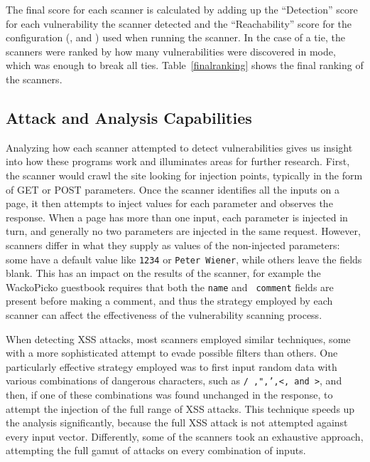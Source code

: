 

The final score for each scanner is calculated by adding up the ``Detection''
score for each vulnerability the scanner detected and the ``Reachability'' score
for the configuration (\initial{}, \config{} and \manual{}) used when
running the scanner. In the case of a tie, the scanners were ranked
by how many vulnerabilities were discovered in \initial{} mode, which
was enough to break all ties. Table~\ref{finalranking} shows the
final ranking of the scanners.


\subsection{Attack and Analysis Capabilities}
\label{attack-and-analysis}
Analyzing how each scanner attempted to detect vulnerabilities gives
us insight into how these programs work and  illuminates areas for
further research. First, the scanner would crawl the site
looking for injection points, typically in the form of GET or POST parameters.
Once the scanner identifies all the inputs on a page, it then attempts to inject
values for each parameter and observes the response. When a page
has more than one input, each parameter is injected in turn, and generally no
two parameters are injected in the same request. However, scanners differ in
what they supply as values of the non-injected parameters: some have a
default value like {\tt 1234} or {\tt Peter Wiener}, while others leave the
fields blank. This has an impact on the results of the scanner, for
example the WackoPicko guestbook requires that both the {\tt name} and {\tt
  comment} fields are present before making a comment, and thus the strategy
employed by each scanner can affect the effectiveness of the
vulnerability scanning process.

When detecting XSS attacks, most scanners employed similar techniques, some with
a more sophisticated attempt to evade possible filters than others. One particularly
effective strategy employed was to first input random data with various
combinations of dangerous characters, such as {\tt /\ ,",',<, and >}, and then, if
one of these combinations was found unchanged in the response, to attempt the
injection of the full range
of XSS attacks. This
technique speeds up the analysis 
significantly, because the full XSS attack is not attempted
against every input vector. Differently, some of the scanners took an
exhaustive 
approach, attempting the full gamut of attacks on every combination of inputs.


